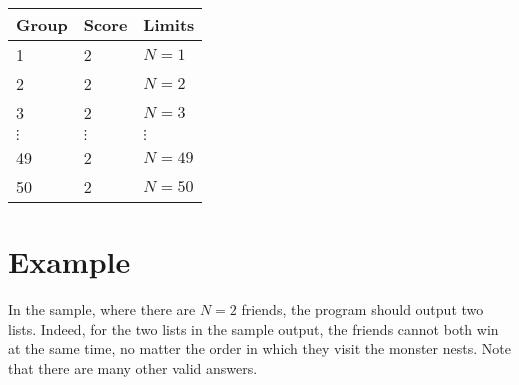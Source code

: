 \noindent
\begin{tabular}{| l | l | l |}
\hline
Group & Score & Limits \\ \hline
  1 & 2 & $N = 1$ \\ \hline
  2 & 2 & $N = 2$ \\ \hline
  3 & 2 & $N = 3$ \\ \hline
  $\vdots$ & $\vdots$ & $\vdots$ \\ \hline
  49 & 2 & $N = 49$ \\ \hline
  50 & 2 & $N = 50$ \\ \hline
\end{tabular}

\section*{Example}

In the sample, where there are $N = 2$ friends, the program should output two lists. Indeed, for the two lists in the sample output, the friends cannot both win at the same time, no matter the order in which they visit the monster nests.
Note that there are many other valid answers.
